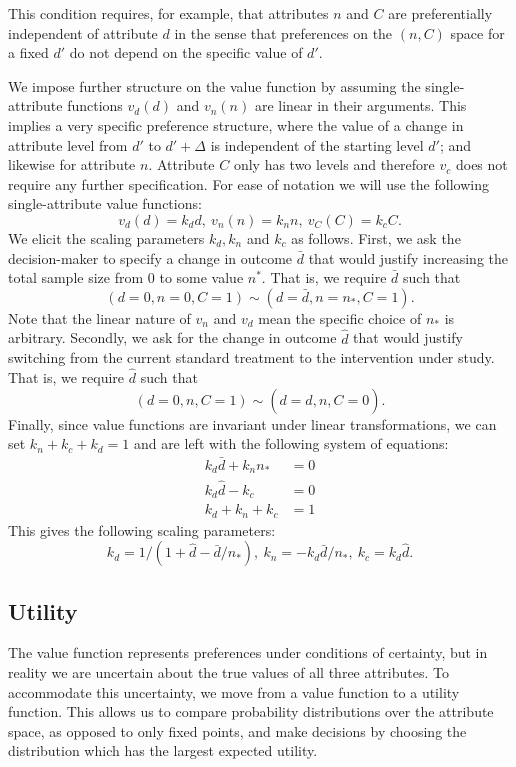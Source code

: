 \documentclass[sagev, Crown]{sagej} %
\begin{document}
This condition requires, for example, that attributes $n$ and $C$ are preferentially independent of attribute $d$ in the sense that preferences on the $(n, C)$ space for a fixed $d'$ do not depend on the specific value of $d'$.

We impose further structure on the value function by assuming the single-attribute functions $ v_d(d)$ and  $v_n(n)$ are linear in their arguments. This implies a very specific preference structure, where the value of a change in attribute level from $d'$ to $d' + \Delta$ is independent of the starting level $d'$; and likewise for attribute $n$. Attribute $C$ only has two levels and therefore $v_c$ does not require any further specification. For ease of notation we will use the following single-attribute value functions:
$$ 
v_d(d) = k_d d, ~ v_n(n) = k_n n, ~ v_C(C) = k_c C.
$$
We elicit the scaling parameters $k_d, k_n$ and $k_c$ as follows. First, we ask the decision-maker to specify a change in outcome $\bar{d}$ that would justify increasing the total sample size from 0 to some value $n^*$. That is, we require $\bar{d}$ such that
$$
(d = 0, n = 0, C = 1) \sim (d = \bar{d}, n = n_*, C = 1).
$$
Note that the linear nature of $v_n$ and $v_d$ mean the specific choice of $n_*$ is arbitrary. Secondly, we ask for the change in outcome $\hat{d}$ that would justify switching from the current standard treatment to the intervention under study. That is, we require $\hat{d}$ such that
$$
(d = 0, n, C = 1) \sim (d = \hat{d}, n, C = 0).
$$
Finally, since value functions are invariant under linear transformations, we can set $k_n + k_c + k_d = 1$ and are left with the following system of equations:
\begin{align*}
k_d \bar{d} + k_n n_* &= 0 \\
k_d \hat{d} - k_c &= 0 \\
k_d + k_n + k_c &= 1
\end{align*}
This gives the following scaling parameters:
\begin{equation}\label{eqn:ks}
k_d = 1/(1 + \hat{d} - \bar{d}/n_*), ~ k_n = -k_d \bar{d}/n_* , ~ k_c = k_d \hat{d}. 
\end{equation}

\subsection{Utility}

The value function represents preferences under conditions of certainty, but in reality we are uncertain about the true values of all three attributes. To accommodate this uncertainty, we move from a value function to a utility function. This allows us to compare probability distributions over the attribute space, as opposed to only fixed points, and make decisions by choosing the distribution which has the largest expected utility.
\end{document}
